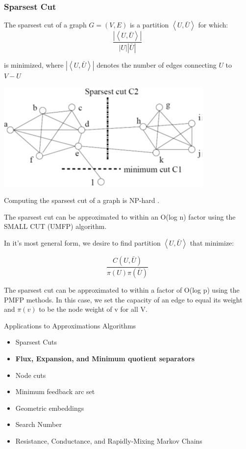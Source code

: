 \begin{frame}
\frametitle{Sparsest Cut}
The sparsest cut of a graph $G=(V,E)$ is a partition $\left \langle U, \bar{U} \right \rangle$ for which:
$$\frac{\left | \left \langle U, \bar{U} \right \rangle \right |}{\left | U \right |\left | \bar{U} \right |}$$

is minimized, where $\left | \left \langle U, \bar{U} \right \rangle \right |$ denotes the number of edges connecting $U$ to $V-U$
\end{frame}

\begin{frame}
\centering
\includegraphics[width=\textwidth]{figs/sparsest_cut.png}
\end{frame}

\begin{frame}
Computing the sparsest cut of a graph is NP-hard .

The sparsest cut can be approximated to within an O(log n) factor using the SMALL CUT (UMFP) algorithm. 

In it's most general form, we desire to find  partition $\left \langle U, \bar{U} \right \rangle$ that minimize:

$$\frac{C(U,\bar{U})}{ \pi(U)\pi(\bar{U}) }$$

The sparsest cut can be approximated to within a factor of O(log p) using the PMFP methods. In this case, we set the capacity of an edge to equal its weight and $\pi(v)$ to be the node weight of v for all  V. 
\end{frame}


\begin{frame}[t]
\begin{block}{Applications to Approximations Algorithms}
	\begin{itemize}
			\item Sparsest Cuts
            \item \textbf{Flux, Expansion, and Minimum quotient separators}
            \item Node cuts
			\item Minimum feedback arc set
            \item Geometric embeddings
        	\item Search Number
            \item Resistance, Conductance, and Rapidly-Mixing Markov Chains
	 \end{itemize} 
\end{block}
\end{frame}

